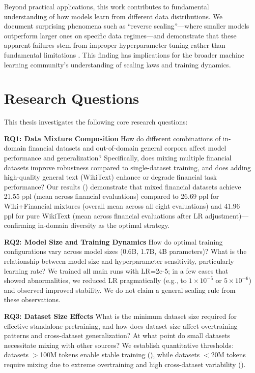 Beyond practical applications, this work contributes to fundamental understanding of how models learn from different data distributions. We document surprising phenomena such as ``reverse scaling''—where smaller models outperform larger ones on specific data regimes—and demonstrate that these apparent failures stem from improper hyperparameter tuning rather than fundamental limitations \parencite{kaplan2020scaling,hoffmann2022training,mccandlish2018empirical}. This finding has implications for the broader machine learning community's understanding of scaling laws and training dynamics.

\section{Research Questions}

This thesis investigates the following core research questions:

\textbf{RQ1: Data Mixture Composition}
How do different combinations of in-domain financial datasets and out-of-domain general corpora affect model performance and generalization? Specifically, does mixing multiple financial datasets improve robustness compared to single-dataset training, and does adding high-quality general text (WikiText) enhance or degrade financial task performance? Our results () demonstrate that mixed financial datasets achieve 21.55 ppl (mean across financial evaluations) compared to 26.69 ppl for Wiki+Financial mixtures (overall mean across all eight evaluations) and 41.96 ppl for pure WikiText (mean across financial evaluations after LR adjustment)—confirming in-domain diversity as the optimal strategy.

\textbf{RQ2: Model Size and Training Dynamics}
How do optimal training configurations vary across model sizes (0.6B, 1.7B, 4B parameters)? What is the relationship between model size and hyperparameter sensitivity, particularly learning rate? We trained all main runs with LR=2e-5; in a few cases that showed abnormalities, we reduced LR pragmatically (e.g., to $1\times10^{-5}$ or $5\times10^{-6}$) and observed improved stability. We do not claim a general scaling rule from these observations.

\textbf{RQ3: Dataset Size Effects}
What is the minimum dataset size required for effective standalone pretraining, and how does dataset size affect overtraining patterns and cross-dataset generalization? At what point do small datasets necessitate mixing with other sources? We establish quantitative thresholds: datasets $>$100M tokens enable stable training (), while datasets $<$20M tokens require mixing due to extreme overtraining and high cross-dataset variability ().

